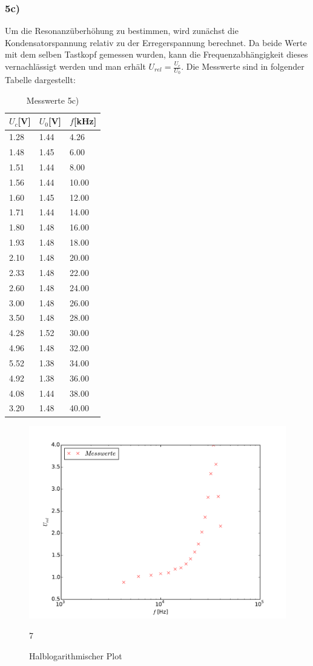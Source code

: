 \subsubsection{5c)}
\label{sec:5c}
Um die Resonanzüberhöhung zu bestimmen, wird zunächst die Kondensatorspannung
relativ zu der Erregerspannung berechnet. Da beide Werte mit dem selben Tastkopf
gemessen wurden, kann die Frequenzabhängigkeit dieses vernachlässigt werden
und man erhält $U_{rel}=\frac{U_c}{U_0}$. Die Messwerte sind in folgender
Tabelle dargestellt:
\begin{table}
\centering
\caption{Messwerte 5c)}
\label{tab:5b}
\begin{tabular}{lll}
\toprule
{$U_c$[V]} & {$U_0$[V]} &{$f$[kHz]}\\
\midrule
1.28 & 1.44 & 4.26 \\
1.48 & 1.45 & 6.00 \\
1.51 & 1.44 & 8.00 \\
1.56 & 1.44 & 10.00 \\
1.60 & 1.45 & 12.00 \\
1.71 & 1.44 & 14.00 \\
1.80 & 1.48 & 16.00 \\
1.93 & 1.48 & 18.00 \\
2.10 & 1.48 & 20.00 \\
2.33 & 1.48 & 22.00 \\
2.60 & 1.48 & 24.00 \\
3.00 & 1.48 & 26.00 \\
3.50 & 1.48 & 28.00 \\
4.28 & 1.52 & 30.00 \\
4.96 & 1.48 & 32.00 \\
5.52 & 1.38 & 34.00 \\
4.92 & 1.38 & 36.00 \\
4.08 & 1.44 & 38.00 \\
3.20 & 1.48 & 40.00 \\
\bottomrule
\end{tabular}
\end{table}
\begin{figure}
  \centering
  \includegraphics[width=\textwidth]{5c.pdf}
  \caption{Halblogarithmischer Plot}7
  \label{fig:5cergebnis}
\end{figure}
